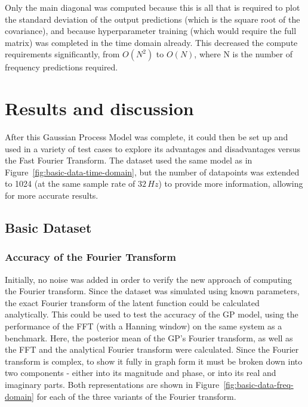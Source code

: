\documentclass[12pt]{article}
\begin{document}
    Only the main diagonal was computed because this is all that is required to plot the standard deviation of the output predictions (which is the square root of the covariance), and because hyperparameter training (which would require the full matrix) was completed in the time domain already.
    This decreased the compute requirements significantly, from $O(N^2)$ to $O(N)$, where N is the number of frequency predictions required.

    \section{Results and discussion}
    After this Gaussian Process Model was complete, it could then be set up and used in a variety of test cases to explore its advantages and disadvantages versus the Fast Fourier Transform.
    The dataset used the same model as in Figure~\ref{fig:basic-data-time-domain}, but the number of datapoints was extended to 1024 (at the same sample rate of $32 \, Hz$) to provide more information, allowing for more accurate results.

    \subsection{Basic Dataset}
    \subsubsection{Accuracy of the Fourier Transform} \label{Acc}
    Initially, no noise was added in order to verify the new approach of computing the Fourier transform.
    Since the dataset was simulated using known parameters, the exact Fourier transform of the latent function could be calculated analytically.
    This could be used to test the accuracy of the GP model, using the performance of the FFT (with a Hanning window) on the same system as a benchmark.
    Here, the posterior mean of the GP's Fourier transform, as well as the FFT and the analytical Fourier transform were calculated.
    Since the Fourier transform is complex, to show it fully in graph form it must be broken down into two components - either into its magnitude and phase, or into its real and imaginary parts.
    Both representations are shown in Figure~\ref{fig:basic-data-freq-domain} for each of the three variants of the Fourier transform.
\end{document}
